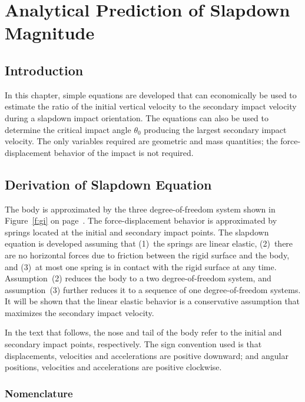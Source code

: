 \chapter{Analytical Prediction of Slapdown Magnitude}
\section{Introduction}

In this chapter, simple equations are developed that can economically
be used to estimate the ratio of the initial vertical velocity to the
secondary impact velocity during a slapdown impact orientation.  The
equations can also be used to determine the critical impact angle
$\theta_0$ producing the largest secondary impact velocity. The only
variables required are geometric and mass quantities; the
force-displacement behavior of the impact is not required. 


\section{Derivation of Slapdown Equation}

The body is approximated by the three degree-of-freedom system shown
in Figure~\ref{f:gi} on page~\pageref{f:gi}.  The force-displacement
behavior is approximated by springs located at the initial and
secondary impact points. The slapdown equation is developed assuming
that (1)~the springs are linear elastic, (2)~there are no horizontal
forces due to friction between the rigid surface and the body, and
(3)~at most one spring is in contact with the rigid surface at any
time.  Assumption~(2) reduces the body to a two degree-of-freedom
system, and assumption~(3) further reduces it to a sequence of one
degree-of-freedom systems. It will be shown that the linear elastic
behavior is a conservative assumption that maximizes the secondary
impact velocity. 

In the text that follows, the nose and tail of the body refer to
the initial and secondary impact points, respectively.  The sign
convention used is that displacements, velocities and accelerations are
positive downward; and angular positions, velocities and accelerations
are positive clockwise. 

\subsection{Nomenclature}

